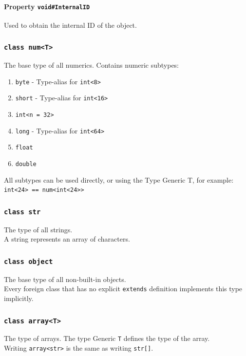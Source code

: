 \documentclass{docs}
\begin{document}
    \paragraph{Property \texttt{void\#InternalID}}
    Used to obtain the internal ID of the object.
    
    \label{typeNum}
    \subsubsection{\texttt{class num<T>}}
    The base type of all numerics. Contains numeric subtypes:
    \begin{enumerate}
        \item \texttt{byte} - Type-alias for \texttt{int<8>} %
        \item \texttt{short} - Type-alias for \texttt{int<16>}
        \item \texttt{int<n = 32>}
        \item \texttt{long} - Type-alias for \texttt{int<64>}
        \item \texttt{float}
        \item \texttt{double}
    \end{enumerate}
    All subtypes can be used directly, or using the Type Generic T, for example: \texttt{int<24> == num<int<24>>}
    
    \label{typeStr}
    \subsubsection{\texttt{class str}}
    The type of all strings.
    \\
    A string represents an array of characters.
    
    \label{typeObject}
    \subsubsection{\texttt{class object}}
    The base type of all non-built-in objects.
    \\
    Every foreign class that has no explicit \texttt{extends} definition implements this type implicitly.
    
    \label{typeArray}
    \subsubsection{\texttt{class array<T>}}
    The type of arrays. The type Generic \texttt{T} defines the type of the array.
    \\
    Writing \texttt{array<str>} is the same as writing \texttt{str[]}.
    
\end{document}

